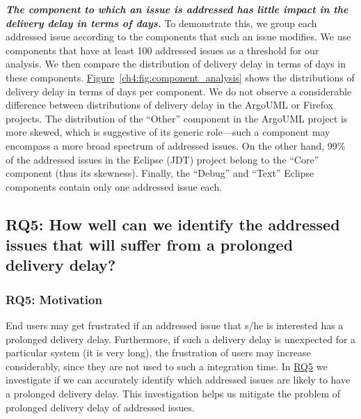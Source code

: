 \noindent\textbf{\textit{The component to which an issue is addressed has little
impact in the delivery delay in terms of days.}} To demonstrate this, we group
each addressed issue according to the components that such an issue modifies. We use
components that have at least 100 addressed issues as a threshold for our analysis.
We then compare the distribution of delivery delay in terms of days in these
components.
\hyperref[ch4:fig:component_analysis]{Figure}~\ref{ch4:fig:component_analysis} shows the
distributions of delivery delay in terms of days per component. We do not
observe a considerable difference between distributions of delivery delay in
the ArgoUML or Firefox projects. The distribution of the ``Other'' component in
the ArgoUML project is more skewed, which is suggestive of its generic
role---such a component may encompass a more broad spectrum of addressed issues. On
the other hand, 99\% of the addressed issues in the Eclipse (JDT) project belong to
the ``Core'' component (thus its skewness). Finally, the ``Debug'' and ``Text''
Eclipse components contain only one addressed issue each.   


\subsection{RQ5: How well can we identify the addressed issues
that will suffer from a prolonged delivery delay?}\label{ch4:rq5}

\subsubsection*{RQ5: Motivation} 

End users may get frustrated if an addressed issue that s/he is interested has a
prolonged delivery delay. Furthermore, if such a delivery delay is unexpected for a
particular system (\eg it is very long), the frustration of users may increase
considerably, since they are not used to such a integration time. In
\hyperref[ch4:rq5]{RQ5} we
investigate if we can accurately identify which addressed issues are likely to
have a prolonged delivery delay. This investigation helps us mitigate the problem of
prolonged delivery delay of addressed issues.

